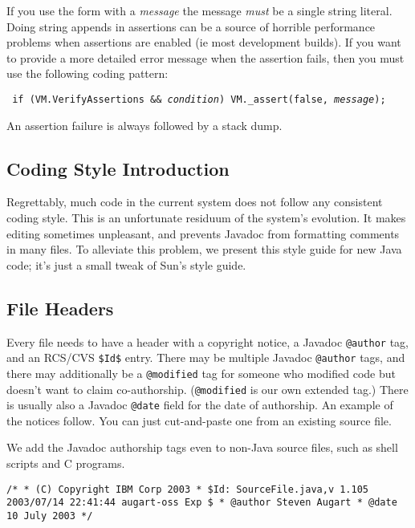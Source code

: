 If you use the form with a {\it message} the message {\em must} be a
single string literal.  Doing string appends in assertions can be a
source of horrible performance problems when assertions are enabled
(ie most development builds).  If you want to provide a
more detailed error message when the assertion fails, then you must
use the following coding pattern:
\begin{example}
\tt{}   if (VM.VerifyAssertions && {\it condition}) VM._assert(false, {\it message});
\end{example}

An assertion failure is always followed by a stack dump.


\subsection{Coding Style Introduction}

Regrettably, much code in the current system does not follow any
consistent coding style.  This is an unfortunate residuum of the
system's evolution.  It makes editing sometimes unpleasant, and
prevents Javadoc from formatting comments in many files.  To alleviate
this problem, we present this style guide for new Java code; it's just
a small tweak of Sun\Rweb{}'s style guide.

\subsection{File Headers}

Every file needs to have a header with a copyright notice, a Javadoc
{\tt @author} tag, and an RCS/CVS {\tt \$Id\$} entry. There may be
multiple Javadoc {\tt @author} tags, and there may
additionally be a {\tt @modified} tag for someone who modified code but
doesn't want to claim co-authorship.  ({\tt @modified} is our own
extended tag.)  There is usually also a Javadoc {\tt @date} field for
the date of authorship.  An example of the notices follow.  You can
just cut-and-paste one from an existing source file.

We add the Javadoc authorship tags even to non-Java source files, such
as shell scripts and C programs.
\begin{example}
\tt{}/*
 * (C) Copyright IBM Corp 2003
 * \${}Id{}: SourceFile.java,v 1.105 2003/07/14 22:41:44 augart-oss Exp \$
 * @author Steven Augart
 * @date 10 July 2003
 */
\end{example}


%
%
